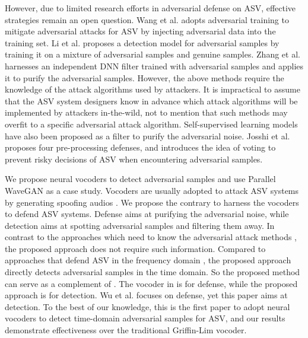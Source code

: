 However, due to limited research efforts \cite{wang2019adversarial,li2020investigating,zhang2020adversarial,wu2021adversarialasv,wu2021improving,joshi2021adversarial,wu2021voting} in adversarial defense on ASV, effective strategies remain an open question. 
Wang et al. \cite{wang2019adversarial} adopts adversarial training to mitigate adversarial attacks for ASV by injecting adversarial data into the training set.
Li et al. \cite{li2020investigating} proposes a detection model for adversarial samples by training it on a mixture of adversarial samples and genuine samples.
Zhang et al. \cite{zhang2020adversarial} harnesses an independent DNN filter trained with adversarial samples and applies it to purify the adversarial samples.
However, the above methods \cite{wang2019adversarial,li2020investigating,zhang2020adversarial} require the knowledge of the attack algorithms used by attackers.
It is impractical to assume that the ASV system designers know in advance which attack algorithms will be implemented by attackers in-the-wild, not to mention that such methods \cite{wang2019adversarial,li2020investigating,zhang2020adversarial} may overfit to a specific adversarial attack algorithm.
Self-supervised learning models have also been proposed \cite{wu2021adversarialasv,wu2021improving} as a filter to purify the adversarial noise.
Josshi et al. \cite{joshi2021adversarial} proposes four pre-processing defenses, and \cite{wu2021voting} introduces the idea of voting to prevent risky decisions of ASV when encountering adversarial samples.

We propose neural vocoders to detect adversarial samples and use Parallel WaveGAN \cite{yamamoto2020parallel} as a case study. 
Vocoders are usually adopted to attack ASV systems by generating spoofing audios \cite{todisco2019asvspoof}.
We propose the contrary to harness the vocoders to defend ASV systems. 
Defense aims at purifying the adversarial noise, while detection aims at spotting adversarial samples and filtering them away.
In contrast to the approaches which need to know the adversarial attack methods \cite{wang2019adversarial,li2020investigating,zhang2020adversarial}, the proposed approach does not require such information.
Compared to approaches that defend ASV in the frequency domain \cite{wu2021adversarialasv,wu2021improving}, the proposed approach directly detects adversarial samples in the time domain.
So the proposed method can serve as a complement of \cite{wu2021adversarialasv,wu2021improving}.
The vocoder in \cite{joshi2021adversarial} is for defense, while the proposed approach is for detection.
Wu et al. \cite{wu2021voting} focuses on defense, yet this paper aims at detection. 
To the best of our knowledge, this is the first paper to adopt neural vocoders to detect time-domain adversarial samples for ASV, and our results demonstrate effectiveness over the traditional Griffin-Lim vocoder.

